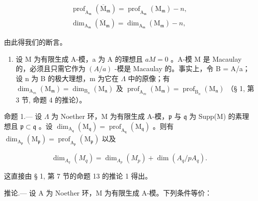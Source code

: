 \[
\begin{array}{l} \operatorname{prof} _ {\mathrm{A} _ {\mathfrak {m}}} (\overline {{\mathrm{M}}} _ {\mathfrak {m}}) = \operatorname{prof} _ {\mathrm{A} _ {\mathfrak {m}}} (\mathrm{M} _ {\mathfrak {m}}) - n, \\ \dim_ {\mathrm{A} _ {\mathfrak {m}}} (\overline {{\mathrm{M}}} _ {\mathfrak {m}}) = \dim_ {\mathrm{A} _ {\mathfrak {m}}} (\mathrm{M} _ {\mathfrak {m}}) - n, \end{array}
\]

由此得我们的断言。

\begin{enumerate}
\def\labelenumi{\arabic{enumi})}
\setcounter{enumi}{3}
\tightlist
\item
  设 M 为有限生成 A-模，a 为 A 的理想且 \(aM = 0\) 。A-模 M 是 Macaulay 的，必须且只需它作为 \((A/a)\) -模是 Macaulay 的。事实上，令 B = A/a；设 n 为 B 的极大理想，m 为它在 \(\Lambda\) 中的原像；有 \(\dim_{\mathrm{A}_{m}}(\mathrm{M}_{\mathfrak{m}}) = \dim_{\mathrm{B}_{n}}(\mathrm{M}_{\mathfrak{n}})\) 及 \(\operatorname{prof}_{\mathrm{A}_{m}}(\mathrm{M}_{\mathfrak{m}}) = \operatorname{prof}_{\mathrm{B}_{n}}(\mathrm{M}_{\mathfrak{n}})\) （§ 1, 第 3 节, 命题 4 的推论）。
\end{enumerate}

命题 1.--- 设 \(\Lambda\) 为 Noether 环，M 为有限生成 A-模，\(\mathfrak{p}\) 与 \(\mathfrak{q}\) 为 Supp(M) 的素理想且 \(\mathfrak{p} \subset \mathfrak{q}\) 。设 \(\dim_{\mathrm{A}_{\mathfrak{q}}}(\mathrm{M}_{\mathfrak{q}}) = \operatorname{prof}_{\mathrm{A}_{\mathfrak{q}}}(\mathrm{M}_{\mathfrak{q}})\) 。则有 \(\dim_{\mathrm{A}_{\mathfrak{p}}}(\mathrm{M}_{\mathfrak{p}}) = \operatorname{prof}_{\mathrm{A}_{\mathfrak{p}}}(\mathrm{M}_{\mathfrak{p}})\) 以及

\[
\dim_ {A _ {q}} (M _ {q}) = \dim_ {A _ {p}} (M _ {p}) + \dim (A _ {q} / p A _ {q}).
\]

这直接由 § 1, 第 7 节的命题 13 的推论 1 得出。

推论.--- 设 A 为 Noether 环，M 为有限生成 A-模。下列条件等价：

